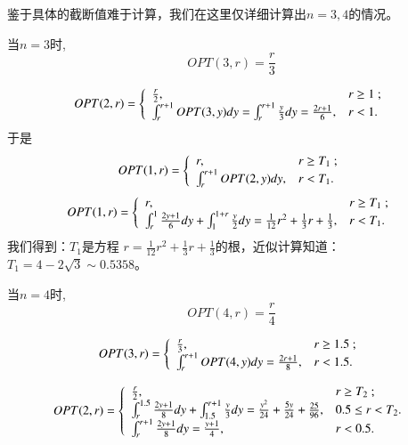 \documentclass[bachelor]{thuthesis}
\begin{document}
鉴于具体的截断值难于计算，我们在这里仅详细计算出$n=3,4$的情况。

当$n=3$时,
\[OPT(3,r)=\frac{r}{3}\]

$$OPT(2,r)=\left\{
                \begin{array}{ll}
                  \frac {r}{2}, & \hbox{$r\geq 1$ ;} \\
                 \int_{r}^{r+1} OPT(3,y)dy=\int_{r}^{r+1} \frac{y}{3}dy=\frac{2r+1}{6}, & \hbox{$r<1$.}
                \end{array}
              \right.$$
于是
$$OPT(1,r)=\left\{
                \begin{array}{ll}
                  r, & \hbox{$r\geq T_1$ ;} \\
                 \int_{r}^{r+1} OPT(2,y)dy, & \hbox{$r<T_{1}$.}
                \end{array}
              \right.$$
$$OPT(1,r)=\left\{
                \begin{array}{ll}
                  r, & \hbox{$r\geq T_1$ ;} \\
                 \int_{r}^{1} \frac {2y+1}{6}   dy+\int_{1}^{1+r} \frac {y}{2} dy=\frac{1}{12}r^2+\frac{1}{3}r+\frac {1}{3}, & \hbox{$r<T_{1}$.}
                \end{array}
              \right.$$
我们得到：$T_1$是方程 $r=\frac{1}{12}r^2+\frac{1}{3}r+\frac 1 3$的根，近似计算知道：$T_1=4-2\sqrt{3}\sim 0.5358$。




当$n=4$时,
\[OPT(4,r)=\frac{r}{4}\]

$$OPT(3,r)=\left\{
                \begin{array}{ll}
                  \frac {r}{3}, & \hbox{$r\geq 1.5$ ;} \\
                 \int_{r}^{r+1} OPT(4,y)dy=\frac{2r+1}{8}, & \hbox{$r<1.5$.}
                \end{array}
              \right.$$

$$OPT(2,r)=\left\{
                \begin{array}{ll}
                  \frac {r}{2}, & \hbox{$r\geq T_2$ ;} \\
                 \int_{r}^{1.5}\frac{2y+1}{8}dy+\int_{1.5}^{r+1}  \frac {y}{3}dy=\frac{y^2}{24}+\frac{5y}{24}+\frac {25} {96}, & \hbox{$0.5\leq r<T_2$.}\\
                 \int_{r}^{r+1} \frac{2y+1}{8} dy=\frac{y+1}{4}, & \hbox{$r<0.5$.}
                \end{array}
              \right.$$
\end{document}
